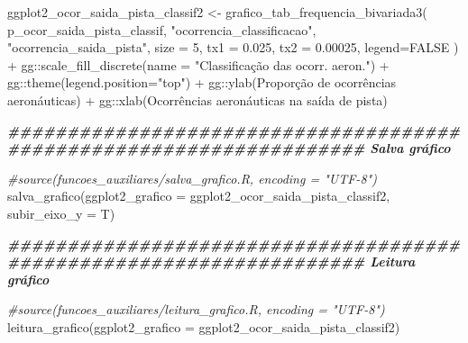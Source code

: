 \documentclass[
]{article}
\newenvironment{Shaded}{\begin{snugshade}}{\end{snugshade}}
\newcommand{\AttributeTok}[1]{\textcolor[rgb]{0.77,0.63,0.00}{#1}}
\newcommand{\CommentTok}[1]{\textcolor[rgb]{0.56,0.35,0.01}{\textit{#1}}}
\newcommand{\ConstantTok}[1]{\textcolor[rgb]{0.00,0.00,0.00}{#1}}
\newcommand{\DecValTok}[1]{\textcolor[rgb]{0.00,0.00,0.81}{#1}}
\newcommand{\DocumentationTok}[1]{\textcolor[rgb]{0.56,0.35,0.01}{\textbf{\textit{#1}}}}
\newcommand{\FloatTok}[1]{\textcolor[rgb]{0.00,0.00,0.81}{#1}}
\newcommand{\FunctionTok}[1]{\textcolor[rgb]{0.00,0.00,0.00}{#1}}
\newcommand{\NormalTok}[1]{#1}
\newcommand{\OtherTok}[1]{\textcolor[rgb]{0.56,0.35,0.01}{#1}}
\newcommand{\SpecialCharTok}[1]{\textcolor[rgb]{0.00,0.00,0.00}{#1}}
\newcommand{\StringTok}[1]{\textcolor[rgb]{0.31,0.60,0.02}{#1}}
\begin{document}
\begin{Shaded}
\begin{Highlighting}[]
\NormalTok{ggplot2\_ocor\_saida\_pista\_classif2 }\OtherTok{\textless{}{-}} \FunctionTok{grafico\_tab\_frequencia\_bivariada3}\NormalTok{(}
\NormalTok{    p\_ocor\_saida\_pista\_classif,}
    \StringTok{"ocorrencia\_classificacao"}\NormalTok{,}
    \StringTok{"ocorrencia\_saida\_pista"}\NormalTok{,}
    \AttributeTok{size =} \DecValTok{5}\NormalTok{,}
    \AttributeTok{tx1 =} \FloatTok{0.025}\NormalTok{,}
    \AttributeTok{tx2 =} \FloatTok{0.00025}\NormalTok{,}
    \AttributeTok{legend=}\ConstantTok{FALSE}
\NormalTok{) }\SpecialCharTok{+}\NormalTok{ gg}\SpecialCharTok{::}\FunctionTok{scale\_fill\_discrete}\NormalTok{(}\AttributeTok{name =} \StringTok{"Classificação das ocorr. aeron."}\NormalTok{) }\SpecialCharTok{+}
\NormalTok{    gg}\SpecialCharTok{::}\FunctionTok{theme}\NormalTok{(}\AttributeTok{legend.position=}\StringTok{"top"}\NormalTok{) }\SpecialCharTok{+} 
\NormalTok{    gg}\SpecialCharTok{::}\FunctionTok{ylab}\NormalTok{(}\StringTok{\textquotesingle{}Proporção de ocorrências aeronáuticas\textquotesingle{}}\NormalTok{) }\SpecialCharTok{+}
\NormalTok{    gg}\SpecialCharTok{::}\FunctionTok{xlab}\NormalTok{(}\StringTok{\textquotesingle{}Ocorrências aeronáuticas na saída de pista\textquotesingle{}}\NormalTok{)}

\DocumentationTok{\#\#\#\#\#\#\#\#\#\#\#\#\#\#\#\#\#\#\#\#\#\#\#\#\#\#\#\#\#\#\#\#\#\#\#\#\#\#\#\#\#\#\#\#\#\#\#\#\#\#\#\#\#\#\#\#\#\#\#\#\#\#\#\#\#\#\#\# Salva gráfico}

\CommentTok{\#source(\textquotesingle{}funcoes\_auxiliares/salva\_grafico.R\textquotesingle{}, encoding = "UTF{-}8")}
\FunctionTok{salva\_grafico}\NormalTok{(}\AttributeTok{ggplot2\_grafico =}\NormalTok{ ggplot2\_ocor\_saida\_pista\_classif2, }\AttributeTok{subir\_eixo\_y =}\NormalTok{ T)}

\DocumentationTok{\#\#\#\#\#\#\#\#\#\#\#\#\#\#\#\#\#\#\#\#\#\#\#\#\#\#\#\#\#\#\#\#\#\#\#\#\#\#\#\#\#\#\#\#\#\#\#\#\#\#\#\#\#\#\#\#\#\#\#\#\#\#\#\#\#\#\#\# Leitura gráfico}

\CommentTok{\#source(\textquotesingle{}funcoes\_auxiliares/leitura\_grafico.R\textquotesingle{}, encoding = "UTF{-}8")}
\FunctionTok{leitura\_grafico}\NormalTok{(}\AttributeTok{ggplot2\_grafico =}\NormalTok{ ggplot2\_ocor\_saida\_pista\_classif2)}
\end{Highlighting}
\end{Shaded}
\end{document}
